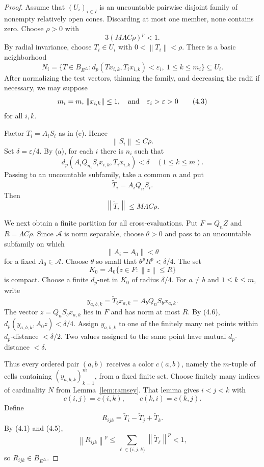 \documentclass[11pt]{article}
\theoremstyle{definition}
\newcommand{\calA}{\mathcal A}
\newcommand{\norm}[1]{\left\lVert #1\right\rVert}
\begin{document}
\begin{proof}
Assume that $(U_i)_{i\in I}$ is an uncountable pairwise disjoint family of
nonempty relatively open cones.  Discarding at most one member, none contains
zero.  Choose $\rho>0$ with
\[
 3(M\Lambda C\rho)^p<1.                                  \tag{4.1}
\]
By radial invariance, choose $T_i\in U_i$ with
$0<\norm{T_i}<\rho$.  There is a basic neighborhood
\[
 N_i=\{T\in B_{E^\triangle}:
 d_p(Tx_{i,k},T_ix_{i,k})<\varepsilon_i,
 \ 1\leq k\leq m_i\}\subseteq U_i.                     \tag{4.2}
\]
After normalizing the test vectors, thinning the family, and decreasing the
radii if necessary, we may suppose
\[
 m_i=m,\\ \norm{x_{i,k}}\leq1,
 \quad\text{and}\quad \varepsilon_i>\varepsilon>0       \tag{4.3}
\]
for all $i,k$.

Factor $T_i=A_iS_i$ as in (c).  Hence
\[
 \norm{S_i}\leq C\rho.                                   \tag{4.4}
\]
Set $\delta=\varepsilon/4$.  By (a), for each $i$ there is $n_i$ such that
\[
 d_p(A_iQ_{n_i}S_ix_{i,k},T_ix_{i,k})<\delta
 \quad(1\leq k\leq m).
\]
Passing to an uncountable subfamily, take a common $n$ and put
\[
 \widetilde T_i=A_iQ_nS_i.
\]
Then
\[
 \norm{\widetilde T_i}\leq M\Lambda C\rho.             \tag{4.5}
\]

We next obtain a finite partition for all cross-evaluations.  Put
$F=Q_nZ$ and $R=\Lambda C\rho$.  Since $\calA$ is norm separable, choose
$\theta>0$ and pass to an uncountable subfamily on which
\[
 \norm{A_i-A_0}<\theta                                   \tag{4.6}
\]
for a fixed $A_0\in\calA$.  Choose $\theta$ so small that
$\theta^pR^p<\delta/4$.  The set
\[
 K_0=A_0\{z\in F:\norm{z}\leq R\}
\]
is compact.  Choose a finite $d_p$-net in $K_0$ of radius $\delta/4$.
For $a\neq b$ and $1\leq k\leq m$, write
\[
 y_{a,b,k}=\widetilde T_bx_{a,k}=A_bQ_nS_bx_{a,k}.
\]
The vector $z=Q_nS_bx_{a,k}$ lies in $F$ and has norm at most $R$.  By
(4.6), $d_p(y_{a,b,k},A_0z)<\delta/4$.  Assign $y_{a,b,k}$ to one of the
finitely many net points within $d_p$-distance $<\delta/2$.  Two values assigned
to the same point have mutual $d_p$-distance $<\delta$.

Thus every ordered pair $(a,b)$ receives a color $c(a,b)$, namely the
$m$-tuple of cells containing $(y_{a,b,k})_{k=1}^m$, from a fixed finite set.
Choose finitely many indices of cardinality $N$ from Lemma~\ref{lem:ramsey}.
That lemma gives $i<j<k$ with
\[
 c(i,j)=c(i,k),\qquad c(k,i)=c(k,j).                      \tag{4.7}
\]
Define
\[
 R_{ijk}=\widetilde T_i-\widetilde T_j+\widetilde T_k.
\]
By (4.1) and (4.5),
\[
 \norm{R_{ijk}}^p
 \leq\sum_{\ell\in\{i,j,k\}}\norm{\widetilde T_\ell}^p
 <1,
\]
so $R_{ijk}\in B_{E^\triangle}$.


\end{proof}
\end{document}
